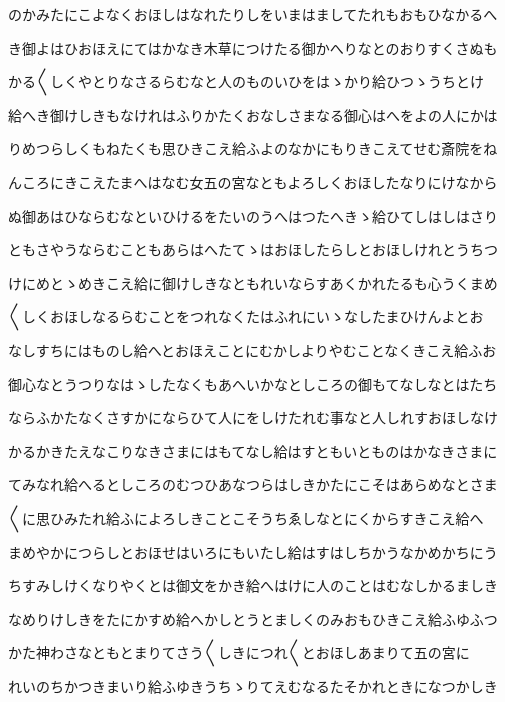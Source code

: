 \documentclass[a4paper,11pt,landscape]{ltjtarticle}
\begin{document}
\par\medskip
のかみたにこよなくおほしはなれたりしをいまはましてたれもおもひなかるへ
\par\medskip
き御よはひおほえにてはかなき木草につけたる御かへりなとのおりすくさぬも
\par\medskip
かる〱しくやとりなさるらむなと人のものいひをはゝかり給ひつゝうちとけ
\par\medskip
給へき御けしきもなけれはふりかたくおなしさまなる御心はへをよの人にかは
\par\medskip
りめつらしくもねたくも思ひきこえ給ふよのなかにもりきこえてせむ斎院をね
\par\medskip
んころにきこえたまへはなむ女五の宮なともよろしくおほしたなりにけなから
\par\medskip
ぬ御あはひならむなといひけるをたいのうへはつたへきゝ給ひてしはしはさり
\par\medskip
ともさやうならむこともあらはへたてゝはおほしたらしとおほしけれとうちつ
\par\medskip
けにめとゝめきこえ給に御けしきなともれいならすあくかれたるも心うくまめ
\par\medskip
〱しくおほしなるらむことをつれなくたはふれにいゝなしたまひけんよとお
\par\medskip
なしすちにはものし給へとおほえことにむかしよりやむことなくきこえ給ふお
\par\medskip
御心なとうつりなはゝしたなくもあへいかなとしころの御もてなしなとはたち
\par\medskip
ならふかたなくさすかにならひて人にをしけたれむ事なと人しれすおほしなけ
\par\medskip
かるかきたえなこりなきさまにはもてなし給はすともいとものはかなきさまに
\par\medskip
てみなれ給へるとしころのむつひあなつらはしきかたにこそはあらめなとさま
\par\medskip
〱に思ひみたれ給ふによろしきことこそうちゑしなとにくからすきこえ給へ
\par\medskip
まめやかにつらしとおほせはいろにもいたし給はすはしちかうなかめかちにう
\par\medskip
ちすみしけくなりやくとは御文をかき給へはけに人のことはむなしかるましき
\par\medskip
なめりけしきをたにかすめ給へかしとうとましくのみおもひきこえ給ふゆふつ
\par\medskip
かた神わさなともとまりてさう〱しきにつれ〱とおほしあまりて五の宮に
\par\medskip
れいのちかつきまいり給ふゆきうちゝりてえむなるたそかれときになつかしき
\par\medskip
\end{document}
